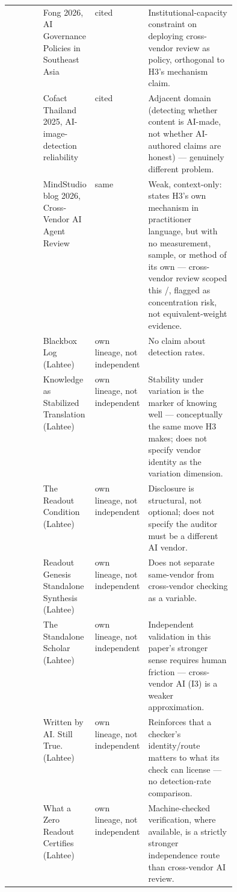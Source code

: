 \documentclass[10pt,twocolumn]{article}
\renewcommand{\texttt}[1]{\seqsplit{#1}}%
\begin{document}
\begin{table}[t]
\begin{tabularx}{\linewidth}{@{}p{0.155\linewidth} p{0.19\linewidth} p{0.1\linewidth} X@{}}
\cite{cite-iseas-sea-governance-008} & Fong 2026, AI Governance Policies in Southeast Asia & cited & Institutional-capacity constraint on deploying cross-vendor review as policy, orthogonal to H3's mechanism claim. \\
\cite{cite-cofact-thai-detector-009} & Cofact Thailand 2025, AI-image-detection reliability & cited & Adjacent domain (detecting whether content is AI-made, not whether AI-authored claims are honest) --- genuinely different problem. \\
\cite{cite-mindstudio-crossvendor-010} & MindStudio blog 2026, Cross-Vendor AI Agent Review & same & Weak, context-only: states H3's own mechanism in practitioner language, but with no measurement, sample, or method of its own --- cross-vendor review scoped this \texttt{CONTEXT\_ONLY}/\texttt{SUPPORTS\_GENERAL\_MECHANISM}, flagged as concentration risk, not equivalent-weight evidence. \\
\cite{cite-own-blackbox-log-h3-006} & Blackbox Log (Lahtee) & own lineage, not independent & No claim about detection rates. \\
\cite{cite-own-knowledge-stabilized-translation-h3-007} & Knowledge as Stabilized Translation (Lahtee) & own lineage, not independent & Stability under variation is the marker of knowing well --- conceptually the same move H3 makes; does not specify vendor identity as the variation dimension. \\
\cite{cite-own-readout-condition-h3-002} & The Readout Condition (Lahtee) & own lineage, not independent & Disclosure is structural, not optional; does not specify the auditor must be a different AI vendor. \\
\cite{cite-own-readout-genesis-h3-003} & Readout Genesis Standalone Synthesis (Lahtee) & own lineage, not independent & Does not separate same-vendor from cross-vendor checking as a variable. \\
\cite{cite-own-standalone-scholar-h3-005} & The Standalone Scholar (Lahtee) & own lineage, not independent & Independent validation in this paper's stronger sense requires human friction --- cross-vendor AI (I3) is a weaker approximation. \\
\cite{cite-own-written-ai-h3-001} & Written by AI. Still True. (Lahtee) & own lineage, not independent & Reinforces that a checker's identity/route matters to what its check can license --- no detection-rate comparison. \\
\cite{cite-own-zero-readout-h3-004} & What a Zero Readout Certifies (Lahtee) & own lineage, not independent & Machine-checked verification, where available, is a strictly stronger independence route than cross-vendor AI review. \\

\end{tabularx}
\end{table}
\end{document}
